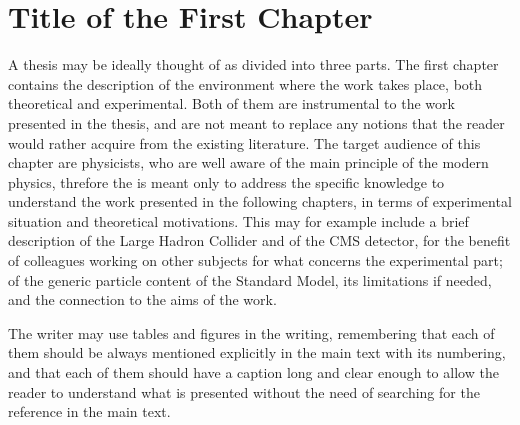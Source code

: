 \chapter{Title of the First Chapter}

A thesis may be ideally thought of as divided into three parts.
The first chapter contains the description of the environment where the work takes place,
both theoretical and experimental.
Both of them are instrumental to the work presented in the thesis, 
and are not meant to replace any notions that the reader would rather acquire 
from the existing literature.
The target audience of this chapter are physicists,
who are well aware of the main principle of the modern physics,
threfore the is meant only to address the specific knowledge to understand the work presented
in the following chapters,
in terms of experimental situation and theoretical motivations.
This may for example include a brief description of the Large Hadron Collider
and of the CMS detector, for the benefit of colleagues working on other subjects
for what concerns the experimental part; 
of the generic particle content of the Standard Model,
its limitations if needed,
and the connection to the aims of the work.

The writer may use tables and figures in the writing,
remembering that each of them should be always mentioned explicitly in the main text with its numbering,
and that each of them should have a caption long and clear enough 
to allow the reader to understand what is presented 
without the need of searching for the reference in the main text.
